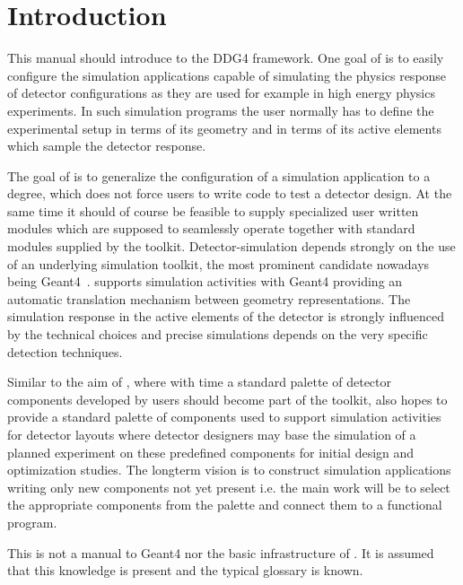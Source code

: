 
\section{Introduction}
\label{sec:ddg4-user-manual-introduction}
\noindent
This manual should introduce to the DDG4 framework. 
One goal of \DDG is to easily configure the simulation applications
capable of simulating the physics response of detector configurations 
as they are used for example in high energy physics experiments.
In such simulation programs the user normally has to define the 
experimental setup in terms of its geometry and in terms of its 
active elements which sample the detector response.

\noindent
The goal of \DDG is to generalize the configuration of a simulation
application to a degree, which does not force users to write code
to test a detector design. At the same time it should of course
be feasible to supply specialized user written modules which are supposed
to seamlessly operate together with standard modules supplied by the toolkit.
Detector-simulation depends strongly on the use of an underlying simulation
toolkit, the most prominent candidate nowadays being Geant4~\cite{bib:geant4}.
\DDhep supports simulation activities with Geant4 providing
an automatic translation mechanism between geometry representations.
The simulation response in the active elements of the detector
is strongly influenced by the technical 
choices and precise simulations depends on the very specific detection techniques.

\noindent
Similar to the aim of \DDhep\cite{bib:DD4hep}, 
where with time a standard palette of detector
components developed by users should become part of the toolkit,
\DDG also hopes to provide a standard palette of components used
to support simulation activities for detector layouts
where detector designers may base the simulation of a planned experiment 
on these predefined components for initial design and optimization 
studies. The longterm vision is to construct simulation applications
writing only new components not yet present i.e. the main work will be to
select the appropriate components from the palette and connect them
to a functional program.

\noindent
This is not a manual to Geant4 nor the basic infrastructure of \DDhep.
It is assumed that this knowledge is present and the typical glossary 
is known.

